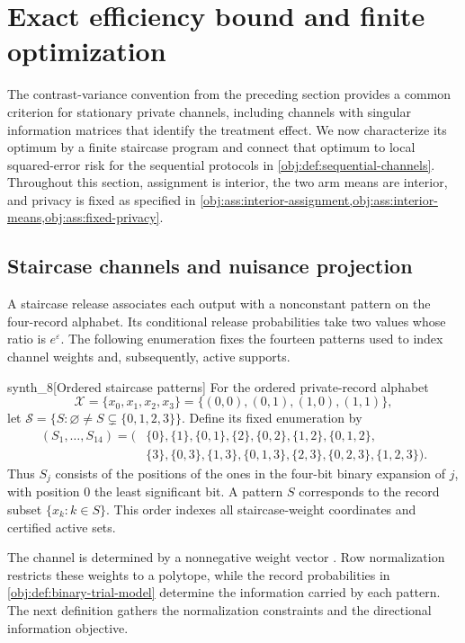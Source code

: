 \section{Exact efficiency bound and finite optimization}

The contrast-variance convention from the preceding section provides a common criterion for stationary private channels, including channels with singular information matrices that identify the treatment effect. We now characterize its optimum by a finite staircase program and connect that optimum to local squared-error risk for the sequential protocols in \cref{obj:def:sequential-channels}. Throughout this section, assignment is interior, the two arm means are interior, and privacy is fixed as specified in \cref{obj:ass:interior-assignment,obj:ass:interior-means,obj:ass:fixed-privacy}.

\subsection{Staircase channels and nuisance projection}

A staircase release associates each output with a nonconstant pattern on the four-record alphabet. Its conditional release probabilities take two values whose ratio is \(e^\varepsilon\). The following enumeration fixes the fourteen patterns  used to index channel weights and, subsequently, active supports.

\begin{definitionv}{synth_8}[Ordered staircase patterns]
For the ordered private-record alphabet
\[
\mathcal X=\{x_0,x_1,x_2,x_3\}
=\{(0,0),(0,1),(1,0),(1,1)\},
\]
let \(\mathcal S=\{S:\varnothing\ne S\subsetneq\{0,1,2,3\}\}\).
Define its fixed enumeration by
\[
\begin{aligned}
(S_1,\ldots,S_{14})=\bigl(
&\{0\},\{1\},\{0,1\},\{2\},\{0,2\},\{1,2\},\{0,1,2\},\\
&\{3\},\{0,3\},\{1,3\},\{0,1,3\},\{2,3\},\{0,2,3\},\{1,2,3\}
\bigr).
\end{aligned}
\]
Thus \(S_j\) consists of the positions of the ones in the four-bit binary expansion of \(j\), with position \(0\) the least significant bit. A pattern \(S\) corresponds to the record subset \(\{x_k:k\in S\}\). This order indexes all staircase-weight coordinates and certified active sets.
\end{definitionv}

The channel is determined by a nonnegative weight vector . Row normalization restricts these weights to a polytope, while the record probabilities in \cref{obj:def:binary-trial-model} determine the information carried by each pattern. The next definition gathers the normalization constraints and the directional information objective.



